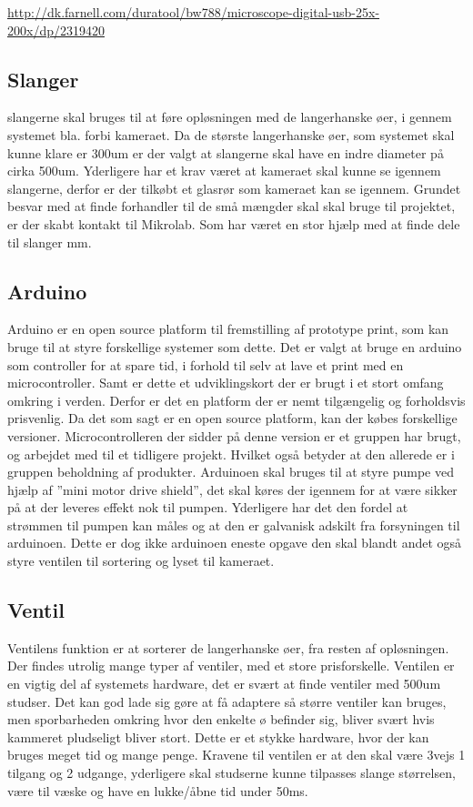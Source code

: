 \url{http://dk.farnell.com/duratool/bw788/microscope-digital-usb-25x-200x/dp/2319420}
 
 \subsection{Slanger}
slangerne skal bruges til at føre opløsningen med de langerhanske øer, i gennem systemet bla. forbi kameraet. Da de største langerhanske øer, som systemet skal kunne klare er 300um er der valgt at slangerne skal have en indre diameter på cirka 500um. Yderligere har et krav været at kameraet skal kunne se igennem slangerne, derfor er der tilkøbt et glasrør som kameraet kan se igennem. Grundet besvar med at finde forhandler til de små mængder skal skal bruge til projektet, er der skabt kontakt til Mikrolab. Som har været en stor hjælp med at finde dele til slanger mm.

\subsection{Arduino}
Arduino er en open source platform til fremstilling af prototype print, som kan bruge til at styre forskellige systemer som dette. Det er valgt at bruge en arduino som controller for at spare tid, i forhold til selv at lave et print med en microcontroller. Samt er dette et udviklingskort der er brugt i et stort omfang omkring i verden. Derfor er det en platform der er nemt tilgængelig og forholdsvis prisvenlig. Da det som sagt er en open source platform, kan der købes forskellige versioner. Microcontrolleren der sidder på denne version er et gruppen har brugt, og arbejdet med til et tidligere projekt. Hvilket også betyder at den allerede er i gruppen beholdning af produkter.
Arduinoen skal bruges til at styre pumpe ved hjælp af ”mini motor drive shield”, det skal køres der igennem for at være sikker på at der leveres effekt nok til pumpen. Yderligere har det den fordel at strømmen til pumpen kan måles og at den er galvanisk adskilt fra forsyningen til arduinoen. Dette er dog ikke arduinoen eneste opgave den skal blandt andet også styre ventilen til sortering og lyset til kameraet.

\subsection{Ventil}
Ventilens funktion er at sorterer de langerhanske øer, fra resten af opløsningen. Der findes utrolig mange typer af ventiler, med et store prisforskelle. Ventilen er en vigtig del af systemets hardware, det er svært at finde ventiler med 500um studser. Det kan god lade sig gøre at få adaptere så større ventiler kan bruges, men sporbarheden omkring hvor den enkelte ø befinder sig, bliver svært hvis kammeret pludseligt bliver stort. Dette er et stykke hardware, hvor der kan bruges meget tid og mange penge.
Kravene til ventilen er at den skal være 3vejs 1 tilgang og 2 udgange, yderligere skal studserne kunne tilpasses slange størrelsen, være til væske og have en lukke/åbne tid under 50ms.

